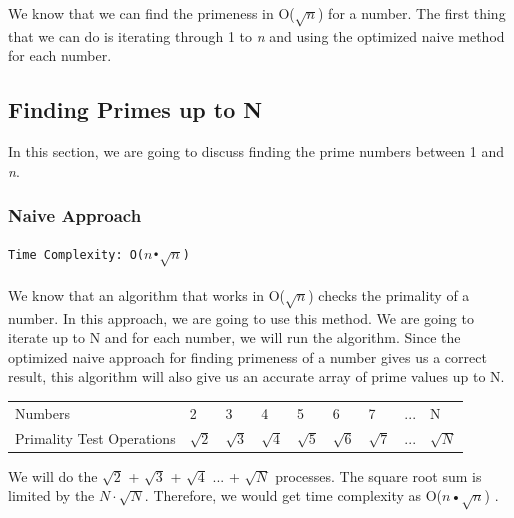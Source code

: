 \documentclass[12pt]{article}
\begin{document}
We know that we can find the primeness in O($\sqrt{n}$) for a number. The first thing that we can do is iterating through 1 to \textit{n} and using the optimized naive method for each number.


\subsection{Finding Primes up to N}
In this section, we are going to discuss finding the prime numbers between 1 and \textit{n}.

\subsubsection{Naive Approach}
\texttt{Time Complexity: O($n$•$\sqrt{n}$) } \\ \\
We know that an algorithm that works in O($\sqrt{n}$) checks the primality of a number. In this approach, we are going to use this method. We are going to iterate up to N and for each number, we will run the algorithm. Since the optimized naive approach for finding primeness of a number gives us a correct result, this algorithm will also give us an accurate array of prime values up to N.

\begin{table}[H]
\begin{tabular}{lllllllll}
Numbers & 2    & 3     & 4     & 5     & 6     & 7     & ...     & N     \\
Primality Test Operations & $\sqrt{2}$  & $\sqrt{3}$    & $\sqrt{4}$     & $\sqrt{5}$    & $\sqrt{6}$    & $\sqrt{7}$ & ...  & $\sqrt{N}$     \\
\end{tabular}
\end{table}
We will do the $\sqrt{2}$ +  $\sqrt{3}$ +  $\sqrt{4}$ ... +  $\sqrt{N}$ processes. The square root sum is limited by the $N\cdot\sqrt{N}$. Therefore, we would get time complexity as O($n$•$\sqrt{n}$) \cite{sqrtsumformula}.
\end{document}
